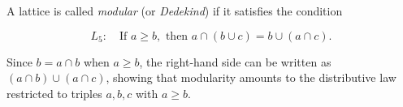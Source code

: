 A lattice is called \textit{modular} (or \textit{Dedekind}) if it satisfies the condition

$$L_5: \quad \text{If } a \geq b, \text{ then } a \cap (b \cup c) = b \cup (a \cap c).$$

Since $b = a \cap b$ when $a \geq b$, the right-hand side can be written as $(a \cap b) \cup (a \cap c)$, showing that modularity amounts to the distributive law restricted to triples $a, b, c$ with $a \geq b$.
